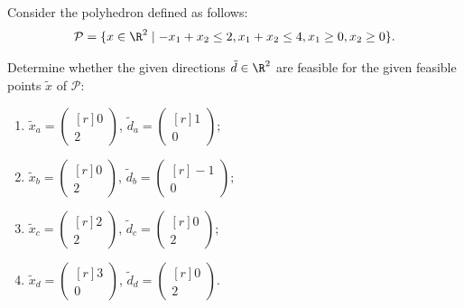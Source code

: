 
Consider the polyhedron defined as follows:
\[
    \mathcal{P} = \{x \in \R^2 \mid -x_1 + x_2 \leq 2, x_1 + x_2 \leq 4, x_1 \geq 0, x_2 \geq 0\}.
\]

Determine whether the given directions $\tilde{d} \in \R^2$  are feasible for the given feasible points $\tilde{x}$ of $\mathcal{P}$:
\begin{enumerate}
    \item $\tilde{x}_a = \begin{pmatrix*}[r] 0 \\ 2 \end{pmatrix*}$, $\tilde{d}_a = \begin{pmatrix*}[r] 1 \\ 0 \end{pmatrix*};$
    \item $\tilde{x}_b = \begin{pmatrix*}[r] 0 \\ 2 \end{pmatrix*}$, $\tilde{d}_b = \begin{pmatrix*}[r] -1 \\ 0 \end{pmatrix*};$
    \item $\tilde{x}_c = \begin{pmatrix*}[r] 2 \\ 2 \end{pmatrix*}$, $\tilde{d}_c = \begin{pmatrix*}[r] 0 \\ 2 \end{pmatrix*};$
    \item $\tilde{x}_d = \begin{pmatrix*}[r] 3 \\ 0 \end{pmatrix*}$, $\tilde{d}_d = \begin{pmatrix*}[r] 0 \\ 2 \end{pmatrix*}.$
\end{enumerate}



